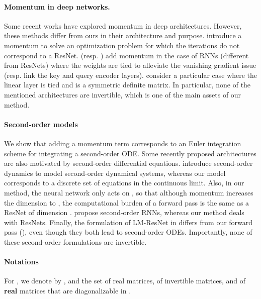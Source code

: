 \documentclass{article}
\begin{document}
\paragraph{Momentum in deep networks.} Some recent works \citep{he2020momentum, chun2020momentum,  nguyen2020momentumrnn, li2018optimization} have explored momentum in deep architectures. However, these methods differ from ours in their architecture and purpose. \citet{chun2020momentum} introduce a momentum to solve an optimization problem for which the iterations do not correspond to a ResNet. 
\citet{nguyen2020momentumrnn} (resp. \citet{he2020momentum}) add momentum in the case of RNNs (different from ResNets) where the weights are tied to alleviate the vanishing gradient issue (resp. link the key and query encoder layers). \citet{li2018optimization} consider a particular case where the linear layer is tied and is a symmetric definite matrix. In particular, none of the mentioned architectures are invertible, which is one of the main assets of our method.
\vspace{-1em}
\paragraph{Second-order models} We show that adding a momentum term corresponds to an Euler integration scheme for integrating a second-order ODE. Some recently proposed architectures \citep{norcliffe2020second, rusch2020coupled, lu2017finite, massaroli2020dissecting} are also motivated by second-order differential equations. \citet{norcliffe2020second} introduce second-order dynamics to model second-order dynamical systems, whereas our model corresponds to a discrete set of equations in the continuous limit. Also, in our method, the neural network only acts on , so that although momentum increases the dimension to , the computational burden of a forward pass is the same as a ResNet of dimension . \citet{rusch2020coupled} propose second-order RNNs, whereas our method deals with ResNets. Finally, the formulation of LM-ResNet in \citet{lu2017finite} differs from our forward pass (), even though they both lead to second-order ODEs. Importantly, none of these second-order formulations are invertible.
\vspace{-1em}
\paragraph{Notations}
For , we denote by ,  and  the set of real matrices, of invertible matrices, and of \textbf{real} matrices that are diagonalizable in . 
\end{document}
